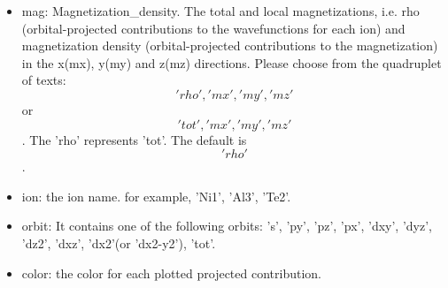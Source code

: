 \documentclass[12pt]{book}
\begin{document}
\begin{itemize}
\begin{itemize}
    \item mag: Magnetization\_density. The total and local magnetizations, i.e. rho (orbital-projected contributions to the wavefunctions for each ion) and magnetization density (orbital-projected contributions to the magnetization) in the x(mx), y(my) and z(mz) directions. Please choose from the quadruplet of texts: \['rho', 'mx', 'my', 'mz'\] or \['tot', 'mx', 'my', 'mz'\]. The 'rho' represents 'tot'. The default is \['rho'\].

    \item ion: the ion name. for example, 'Ni1', 'Al3', 'Te2'.

    \item orbit: It contains one of the following orbits: 's', 'py', 'pz', 'px', 'dxy', 'dyz', 'dz2', 'dxz', 'dx2'(or 'dx2-y2'), 'tot'. 

    \item color: the color for each plotted projected contribution.


\end{itemize}
\end{itemize}
\end{document}
